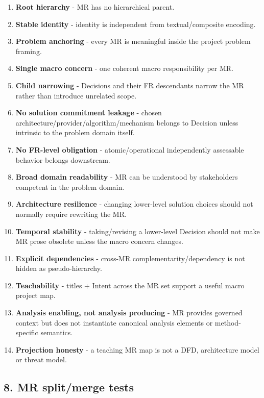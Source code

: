 \documentclass[
  10pt,
]{article}
\providecommand{\tightlist}{%
  \setlength{\itemsep}{0pt}\setlength{\parskip}{0pt}}
\begin{document}
\begin{enumerate}
\def\labelenumi{\arabic{enumi}.}
\tightlist
\item
  \textbf{Root hierarchy} - MR has no hierarchical parent.
\item
  \textbf{Stable identity} - identity is independent from
  textual/composite encoding.
\item
  \textbf{Problem anchoring} - every MR is meaningful inside the project
  problem framing.
\item
  \textbf{Single macro concern} - one coherent macro responsibility per
  MR.
\item
  \textbf{Child narrowing} - Decisions and their FR descendants narrow
  the MR rather than introduce unrelated scope.
\item
  \textbf{No solution commitment leakage} - chosen
  architecture/provider/algorithm/mechanism belongs to Decision unless
  intrinsic to the problem domain itself.
\item
  \textbf{No FR-level obligation} - atomic/operational independently
  assessable behavior belongs downstream.
\item
  \textbf{Broad domain readability} - MR can be understood by
  stakeholders competent in the problem domain.
\item
  \textbf{Architecture resilience} - changing lower-level solution
  choices should not normally require rewriting the MR.
\item
  \textbf{Temporal stability} - taking/revising a lower-level Decision
  should not make MR prose obsolete unless the macro concern changes.
\item
  \textbf{Explicit dependencies} - cross-MR complementarity/dependency
  is not hidden as pseudo-hierarchy.
\item
  \textbf{Teachability} - titles + Intent across the MR set support a
  useful macro project map.
\item
  \textbf{Analysis enabling, not analysis producing} - MR provides
  governed context but does not instantiate canonical analysis elements
  or method-specific semantics.
\item
  \textbf{Projection honesty} - a teaching MR map is not a DFD,
  architecture model or threat model.
\end{enumerate}

\subsection{8. MR split/merge tests}\label{8-mr-splitmerge-tests}
\end{document}
